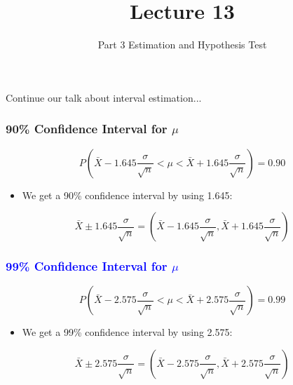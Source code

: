 \documentclass[12pt]{beamer}
\title[ECON2843]{Lecture 13}
\subtitle{Part 3 Estimation and Hypothesis Test}
\date{}
\begin{document}
	\begin{frame}
		\titlepage
	\end{frame}
	\begin{frame}
		\vspace{1cm}
		\centering
		{\color{blue}\large Continue our talk about interval estimation...}
	\end{frame}
\begin{frame}
	\frametitle{90\% Confidence Interval for $\mu$}
	
	\begin{equation*}
		P\left(\bar{X} - 1.645\frac{\sigma}{\sqrt{n}} < \mu < \bar{X} + 1.645\frac{\sigma}{\sqrt{n}}\right) = 0.90
	\end{equation*}
	

	\begin{itemize}[label={\color{blue}$\blacktriangleright$}]
		\item We get a 90\% confidence interval by using 1.645:
	\end{itemize}
	

	\begin{equation*}
		\bar{X} \pm 1.645\frac{\sigma}{\sqrt{n}} = \left(\bar{X} - 1.645\frac{\sigma}{\sqrt{n}}, \bar{X} + 1.645\frac{\sigma}{\sqrt{n}}\right)
	\end{equation*}
	
\end{frame}
\begin{frame}
	\frametitle{\textcolor{blue}{99\% Confidence Interval for $\mu$}}
	
	\begin{equation*}
		P\left(\bar{X} - 2.575\frac{\sigma}{\sqrt{n}} < \mu < \bar{X} + 2.575\frac{\sigma}{\sqrt{n}}\right) = 0.99
	\end{equation*}
	
	
	\begin{itemize}[label={\color{blue}$\blacktriangleright$}]
		\item We get a 99\% confidence interval by using 2.575:
	\end{itemize}
	
	
	\begin{equation*}
		\bar{X} \pm 2.575\frac{\sigma}{\sqrt{n}} = \left(\bar{X} - 2.575\frac{\sigma}{\sqrt{n}}, \bar{X} + 2.575\frac{\sigma}{\sqrt{n}}\right)
	\end{equation*}
	
\end{frame}
\end{document}
